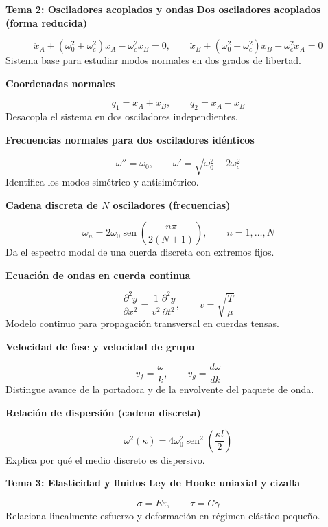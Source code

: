 \documentclass[12pt, a4paper]{article}
\theoremstyle{plain}
\theoremstyle{definition}
\theoremstyle{remark}
\DeclareMathOperator{\sen}{sen}
\newcommand{\formulaname}[1]{\textbf{#1}\par\vspace{2pt}}
\begin{document}
\textbf{Tema 2: Osciladores acoplados y ondas}
\formulaname{Dos osciladores acoplados (forma reducida)}
\begin{equation}
  \ddot{x}_A+(\omega_0^2+\omega_c^2)x_A-\omega_c^2x_B=0,\qquad
  \ddot{x}_B+(\omega_0^2+\omega_c^2)x_B-\omega_c^2x_A=0
\end{equation}
Sistema base para estudiar modos normales en dos grados de libertad.

\formulaname{Coordenadas normales}
\begin{equation}
  q_1=x_A+x_B,\qquad q_2=x_A-x_B
\end{equation}
Desacopla el sistema en dos osciladores independientes.

\formulaname{Frecuencias normales para dos osciladores idénticos}
\begin{equation}
  \omega''=\omega_0,\qquad \omega'=\sqrt{\omega_0^2+2\omega_c^2}
\end{equation}
Identifica los modos simétrico y antisimétrico.

\formulaname{Cadena discreta de $N$ osciladores (frecuencias)}
\begin{equation}
  \omega_n=2\omega_0\sen\!\left(\frac{n\pi}{2(N+1)}\right),\qquad n=1,\dots,N
\end{equation}
Da el espectro modal de una cuerda discreta con extremos fijos.

\formulaname{Ecuación de ondas en cuerda continua}
\begin{equation}
  \frac{\partial^2 y}{\partial x^2}=\frac{1}{v^2}\frac{\partial^2 y}{\partial t^2},
  \qquad v=\sqrt{\frac{T}{\mu}}
\end{equation}
Modelo continuo para propagación transversal en cuerdas tensas.

\formulaname{Velocidad de fase y velocidad de grupo}
\begin{equation}
  v_f=\frac{\omega}{k},\qquad v_g=\frac{d\omega}{dk}
\end{equation}
Distingue avance de la portadora y de la envolvente del paquete de onda.

\formulaname{Relación de dispersión (cadena discreta)}
\begin{equation}
  \omega^2(\kappa)=4\omega_0^2\sen^2\!\left(\frac{\kappa l}{2}\right)
\end{equation}
Explica por qué el medio discreto es dispersivo.

\textbf{Tema 3: Elasticidad y fluidos}
\formulaname{Ley de Hooke uniaxial y cizalla}
\begin{equation}
  \sigma=E\varepsilon,\qquad \tau=G\gamma
\end{equation}
Relaciona linealmente esfuerzo y deformación en régimen elástico pequeño.
\end{document}
